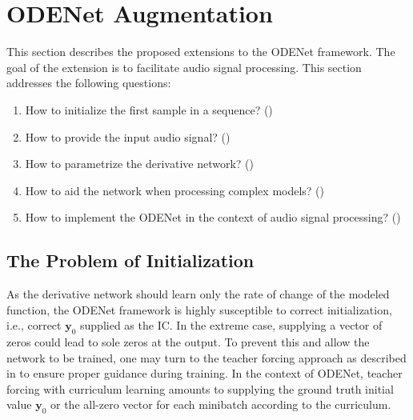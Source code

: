 \section{ODENet Augmentation}

This section describes the proposed extensions to the ODENet framework. The goal of the extension is to facilitate audio signal processing. This section addresses the following questions:
\begin{enumerate}
  \item How to initialize the first sample in a sequence? ()
  \item How to provide the input audio signal? ()
  \item How to parametrize the derivative network? ()
  \item How to aid the network when processing complex models? ()
  \item How to implement the ODENet in the context of audio signal processing? ()
\end{enumerate}

\subsection{The Problem of Initialization}
\label{subsec:initialization}

As the derivative network should learn only the rate of change of the modeled function, the ODENet framework is highly susceptible to correct initialization, i.e., correct $\pmb{y}_0$ supplied as the \acf{IC}. In the extreme case, supplying a vector of zeros could lead to sole zeros at the output. To prevent this and allow the network to be trained, one may turn to the teacher forcing approach
as described in 
to ensure proper guidance during training. In the context of ODENet, teacher forcing with curriculum learning amounts to supplying the ground truth initial value $\pmb{y}_0$ or the all-zero vector for each minibatch according to the curriculum.


